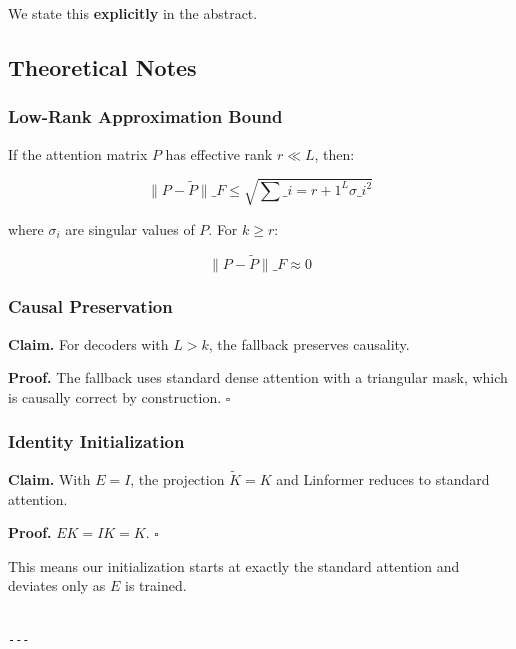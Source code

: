 We state this \textbf{explicitly} in the abstract.

\subsection{Theoretical Notes}

\subsubsection{Low-Rank Approximation Bound}

If the attention matrix $P$ has effective rank $r \ll L$, then:

\[
\|P - \tilde{P}\|\_F \leq \sqrt{\sum\_{i=r+1}^L \sigma\_i^2}
\tag{4.4}
\]

where $\sigma_i$ are singular values of $P$. For $k \geq r$:

\[
\|P - \tilde{P}\|\_F \approx 0
\tag{4.5}
\]

\subsubsection{Causal Preservation}

\textbf{Claim.} For decoders with $L > k$, the fallback preserves causality.

\textbf{Proof.} The fallback uses standard dense attention with a triangular mask, 
which is causally correct by construction. $\square$

\subsubsection{Identity Initialization}

\textbf{Claim.} With $E = I$, the projection $\tilde{K} = K$ and Linformer 
reduces to standard attention.

\textbf{Proof.} $E K = I K = K$. $\square$

This means our initialization starts at exactly the standard attention and 
deviates only as $E$ is trained.
\begin{lstlisting}

---
\end{lstlisting}